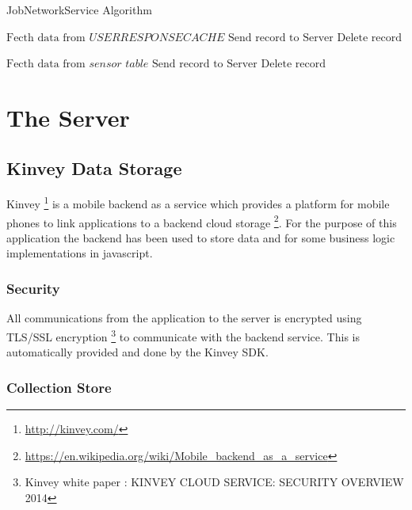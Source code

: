 \begin{algorithm}
\caption{JobNetworkService Algorithm}\label{nextday}
\begin{algorithmic}[1]
\State $ \text{Fecth data from } \textit{USERRESPONSECACHE}$
  \State $\text{Send record to Server}$
  \State $\text{Delete record}$  
  \EndIf
  \EndIf
 	\EndFor

 	 \State $ \text{Fecth data from } \textit{sensor table}$
  \State $\text{Send record to Server}$
  \State $\text{Delete record}$  
  \EndIf
  \EndIf
 	\EndFor
	
 	\EndFor
\EndProcedure
\end{algorithmic}
\end{algorithm}



\section{The Server}

\subsection{Kinvey Data Storage}

Kinvey \footnote{\url{http://kinvey.com/}} is a mobile backend as a service which provides a platform for mobile phones to link applications to a backend cloud storage \footnote{\url{https://en.wikipedia.org/wiki/Mobile_backend_as_a_service}}. For the purpose of this application the backend has been used to store data and for some business logic implementations in javascript.

\subsubsection{Security}

All communications from the application to the server is encrypted using TLS/SSL encryption \footnote{Kinvey white paper : KINVEY CLOUD
SERVICE: SECURITY
OVERVIEW 2014} to communicate with the backend service. This is automatically provided and done by the Kinvey SDK.

\subsubsection{Collection Store}

